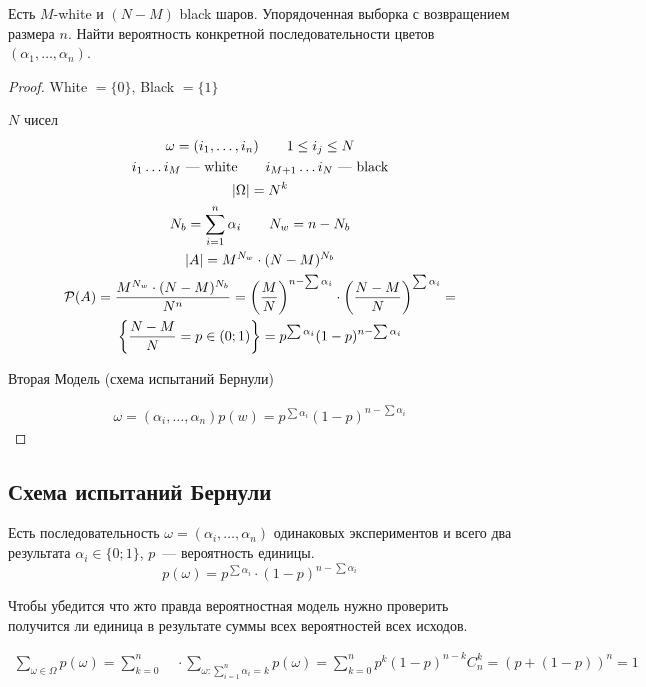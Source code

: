 \begin{problem}
    Есть $M$-white и $(N-M)$ black шаров. Упорядоченная выборка с возвращением размера $n$. Найти вероятность конкретной последовательности цветов $(\alpha_1,\ldots, \alpha_n)$.   
\end{problem}
\begin{proof}
White $= \{0\}$, Black $= \{1\}$
    
$N$ чисел 
\begin{gather*}
\omega = (i_1,\ldots, i_n) \qquad 1 \leq i_j \leq N\\
i_1 \ldots i_M \text{ --- white} \qquad
i_{M+1} \ldots i_N \text{ --- black} \\
|\Omega| = N^k\\
N_b = \sum_{i=1}^n \alpha_i \qquad N_w = n-N_b \\
|A| = M^{N_w} \cdot (N-M)^{N_b} \\
\mathcal{P}(A) = \frac{M^{N_w} \cdot (N-M)^{N_b}}{N^n} = 
\left( \frac{M}{N} \right)^{n - \sum \alpha_i} \cdot \left( \frac{N-M}{N}\right)^{\sum\alpha_i} = \\
\left\{\frac{N-M}{N}=p\in(0;1)\right\} =
p^{\sum\alpha_i}(1-p)^{n-\sum\alpha_i}
\end{gather*}

Вторая Модель (схема испытаний Бернули) 

 \begin{gather*}
     \omega = (\alpha_i,\ldots,\alpha_n)
     p(w) = p^{\sum\alpha_i}(1-p)^{n-\sum\alpha_i}
 \end{gather*}
\end{proof}

\subsection{Схема испытаний Бернули}
Есть последовательность $\omega = (\alpha_i,\ldots,\alpha_n)$ одинаковых экспериментов и всего два результата $\alpha_i \in \{0;1\}$, $p$~--- вероятность единицы.
\[ p(\omega) = p^{\sum\alpha_i}\cdot(1-p)^{n-\sum\alpha_i} \]

Чтобы убедится что жто правда вероятностная модель нужно проверить получится ли единица в результате суммы всех вероятностей всех исходов.

\begin{gather*}
    \sum_{\omega\in\Omega}p(\omega)=
    \sum_{k=0}^n \quad \cdot \sum_{\omega:\sum_{i=1}^n\alpha_i=k} p(\omega) =
    \sum_{k=0}^np^k (1 - p)^{n-k} C_n^k = (p + (1 - p))^n = 1
\end{gather*}



